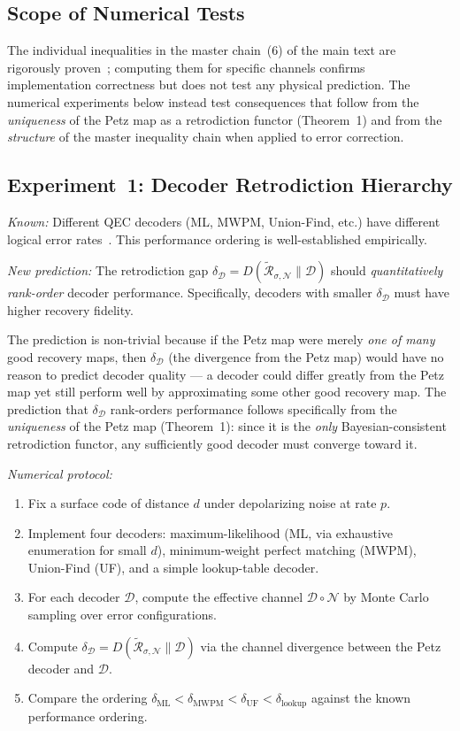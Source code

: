 \documentclass[prl,twocolumn,superscriptaddress,longbibliography]{revtex4-2}
\newcommand{\Petz}{\mathcal{R}}
\newcommand{\chan}{\mathcal{N}}
\begin{document}
\subsection{Scope of Numerical Tests}

The individual inequalities in the master chain~(6) of the main text
are rigorously proven~\cite{Junge2018,Fawzi2015,ReebWolf2014};
computing them for specific channels confirms implementation
correctness but does not test any physical prediction.
The numerical experiments below instead test consequences that follow
from the \emph{uniqueness} of the Petz map as a
retrodiction functor (Theorem~1) and from the \emph{structure} of
the master inequality chain when applied to error correction.

\subsection{Experiment~1: Decoder Retrodiction Hierarchy}

\emph{Known:} Different QEC decoders (ML, MWPM, Union-Find, etc.)
have different logical error rates~\cite{deMartiOlius2024}. This
performance ordering is well-established empirically.

\emph{New prediction:} The retrodiction gap
$\delta_{\mathcal{D}} = D(\tilde{\Petz}_{\sigma,\chan}\|\mathcal{D})$
should \emph{quantitatively rank-order} decoder performance.
Specifically, decoders with smaller $\delta_{\mathcal{D}}$ must have
higher recovery fidelity.

The prediction is non-trivial because if the Petz map were merely
\emph{one of many} good recovery maps, then
$\delta_{\mathcal{D}}$ (the divergence from the Petz map) would have
no reason to predict decoder quality --- a decoder could differ
greatly from the Petz map yet still perform well by approximating
some other good recovery map. The prediction that
$\delta_{\mathcal{D}}$ rank-orders performance follows specifically
from the \emph{uniqueness} of the Petz map (Theorem~1): since
it is the \emph{only} Bayesian-consistent retrodiction functor, any
sufficiently good decoder must converge toward it.

\emph{Numerical protocol:}
\begin{enumerate}
\item Fix a surface code of distance $d$ under depolarizing noise
  at rate $p$.
\item Implement four decoders: maximum-likelihood (ML, via exhaustive
  enumeration for small $d$), minimum-weight perfect matching (MWPM),
  Union-Find (UF), and a simple lookup-table decoder.
\item For each decoder $\mathcal{D}$, compute the effective
  channel $\mathcal{D} \circ \chan$ by Monte Carlo sampling over
  error configurations.
\item Compute
  $\delta_{\mathcal{D}} = D(\tilde{\Petz}_{\sigma,\chan}\|\mathcal{D})$
  via the channel divergence between the Petz decoder and
  $\mathcal{D}$.
\item Compare the ordering $\delta_{\mathrm{ML}} < \delta_{\mathrm{MWPM}}
  < \delta_{\mathrm{UF}} < \delta_{\mathrm{lookup}}$ against the
  known performance ordering.
\end{enumerate}
\end{document}
